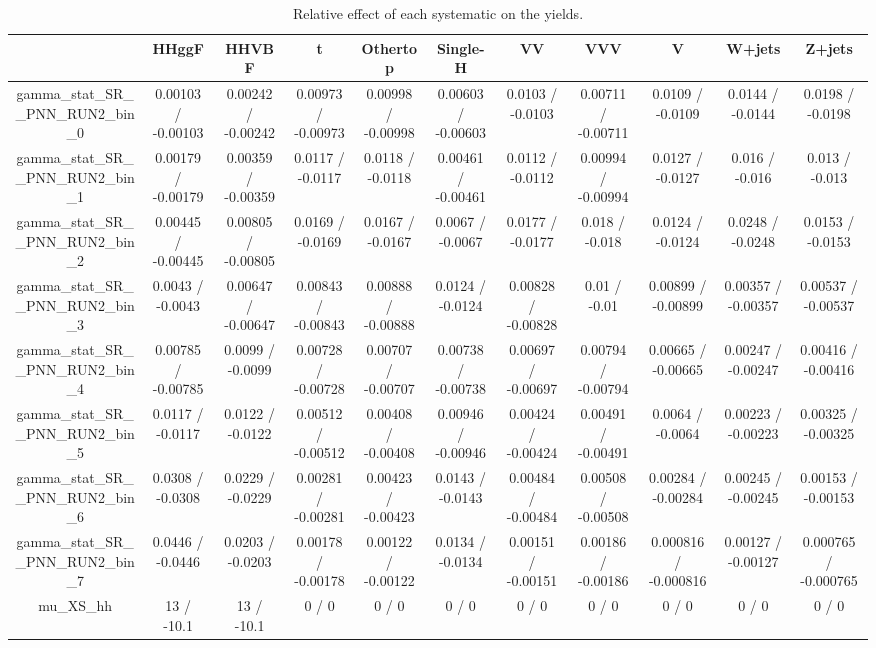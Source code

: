 \documentclass[10pt]{article}
\begin{document}
\begin{table}[htbp]
\begin{center}
\begin{tabular}{|c|c|c|c|c|c|c|c|c|c|c|}
\hline 
      & HHggF      & HHVBF      & t      & Othertop      & Single-H      & VV      & VVV      & V      & W+jets      & Z+jets \\ 
\hline 
  gamma_stat_SR__PNN_RUN2_bin_0 & 0.00103 / -0.00103 & 0.00242 / -0.00242 & 0.00973 / -0.00973 & 0.00998 / -0.00998 & 0.00603 / -0.00603 & 0.0103 / -0.0103 & 0.00711 / -0.00711 & 0.0109 / -0.0109 & 0.0144 / -0.0144 & 0.0198 / -0.0198 \\ 
  gamma_stat_SR__PNN_RUN2_bin_1 & 0.00179 / -0.00179 & 0.00359 / -0.00359 & 0.0117 / -0.0117 & 0.0118 / -0.0118 & 0.00461 / -0.00461 & 0.0112 / -0.0112 & 0.00994 / -0.00994 & 0.0127 / -0.0127 & 0.016 / -0.016 & 0.013 / -0.013 \\ 
  gamma_stat_SR__PNN_RUN2_bin_2 & 0.00445 / -0.00445 & 0.00805 / -0.00805 & 0.0169 / -0.0169 & 0.0167 / -0.0167 & 0.0067 / -0.0067 & 0.0177 / -0.0177 & 0.018 / -0.018 & 0.0124 / -0.0124 & 0.0248 / -0.0248 & 0.0153 / -0.0153 \\ 
  gamma_stat_SR__PNN_RUN2_bin_3 & 0.0043 / -0.0043 & 0.00647 / -0.00647 & 0.00843 / -0.00843 & 0.00888 / -0.00888 & 0.0124 / -0.0124 & 0.00828 / -0.00828 & 0.01 / -0.01 & 0.00899 / -0.00899 & 0.00357 / -0.00357 & 0.00537 / -0.00537 \\ 
  gamma_stat_SR__PNN_RUN2_bin_4 & 0.00785 / -0.00785 & 0.0099 / -0.0099 & 0.00728 / -0.00728 & 0.00707 / -0.00707 & 0.00738 / -0.00738 & 0.00697 / -0.00697 & 0.00794 / -0.00794 & 0.00665 / -0.00665 & 0.00247 / -0.00247 & 0.00416 / -0.00416 \\ 
  gamma_stat_SR__PNN_RUN2_bin_5 & 0.0117 / -0.0117 & 0.0122 / -0.0122 & 0.00512 / -0.00512 & 0.00408 / -0.00408 & 0.00946 / -0.00946 & 0.00424 / -0.00424 & 0.00491 / -0.00491 & 0.0064 / -0.0064 & 0.00223 / -0.00223 & 0.00325 / -0.00325 \\ 
  gamma_stat_SR__PNN_RUN2_bin_6 & 0.0308 / -0.0308 & 0.0229 / -0.0229 & 0.00281 / -0.00281 & 0.00423 / -0.00423 & 0.0143 / -0.0143 & 0.00484 / -0.00484 & 0.00508 / -0.00508 & 0.00284 / -0.00284 & 0.00245 / -0.00245 & 0.00153 / -0.00153 \\ 
  gamma_stat_SR__PNN_RUN2_bin_7 & 0.0446 / -0.0446 & 0.0203 / -0.0203 & 0.00178 / -0.00178 & 0.00122 / -0.00122 & 0.0134 / -0.0134 & 0.00151 / -0.00151 & 0.00186 / -0.00186 & 0.000816 / -0.000816 & 0.00127 / -0.00127 & 0.000765 / -0.000765 \\ 
  mu_XS_hh & 13 / -10.1 & 13 / -10.1 & 0 / 0 & 0 / 0 & 0 / 0 & 0 / 0 & 0 / 0 & 0 / 0 & 0 / 0 & 0 / 0 \\ 
\hline 
\end{tabular} 
\caption{Relative effect of each systematic on the yields.} 
\end{center} 
\end{table} 
\end{document}
